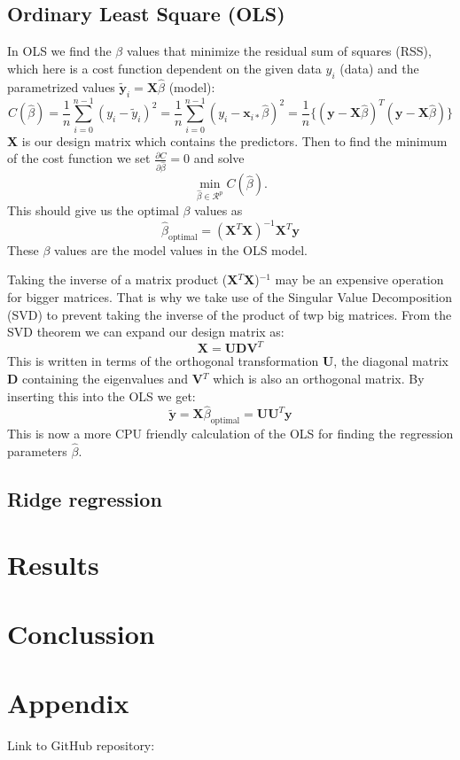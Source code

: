 \documentclass[12pt,a4paper,english]{article}
\begin{document}
\subsection{Ordinary Least Square (OLS)}
In OLS we find the $\beta$ values that minimize the residual sum of squares (RSS), which here is a cost function dependent on the given data $y_i$ (data) and the parametrized values $\tilde{\textbf{y}}_i=\textbf{X}\hat{\beta}$ (model):
\begin{equation}
C(\hat{\beta})=\frac{1}{n}\sum_{i=0}^{n-1}(y_i-\tilde{y}_i)^2=\frac{1}{n}\sum_{i=0}^{n-1}(y_i-\textbf{x}_{i*}\hat{\beta})^2=\frac{1}{n}\{(\textbf{y}-\textbf{X}\hat{\beta})^T(\textbf{y}-\textbf{X}\hat{\beta})\}
\end{equation} 
\textbf{X} is our design matrix which contains the predictors. Then to find the minimum of the cost function we set $\frac{\partial C}{\partial \hat{\beta}}=0$ and solve
\[\min_{\hat{\beta}\in \mathcal{R}^p}C(\hat{\beta}).\] This should give us the optimal $\beta$ values as
\begin{equation}
\label{eq:beta_OLS_opt}
\hat{\beta}_{\text{optimal}}=(\textbf{X}^T\textbf{X})^{-1}\textbf{X}^T\textbf{y}
\end{equation}
These $\beta$ values are the model values in the OLS model.

Taking the inverse of a matrix product (\textbf{X}$^T$\textbf{X})$^{-1}$ may be an expensive operation for bigger matrices. That is why we take use of the Singular Value Decomposition (SVD) to prevent taking the inverse of the product of twp big matrices. From the SVD theorem we can expand our design matrix as:
\[\textbf{X}=\textbf{U}\textbf{D}\textbf{V}^T\]
This is written in terms of the orthogonal transformation \textbf{U}, the diagonal matrix \textbf{D} containing the eigenvalues and \textbf{V}$^T$ which is also an orthogonal matrix. By inserting this into the OLS we get:
\begin{equation}
\label{eq:beta_SVD_OLS}
\tilde{\textbf{y}}=\textbf{X}\hat{\beta}_{\text{optimal}}=\textbf{U}\textbf{U}^T\textbf{y}
\end{equation}
This is now a more CPU friendly calculation of the OLS for finding the regression parameters $\hat{\beta}$.

\subsection{Ridge regression}

\section{Results}
\section{Conclussion}

\appendix
\section{Appendix}
\label{sect:appendix}
Link to GitHub repository:\\
\end{document}
